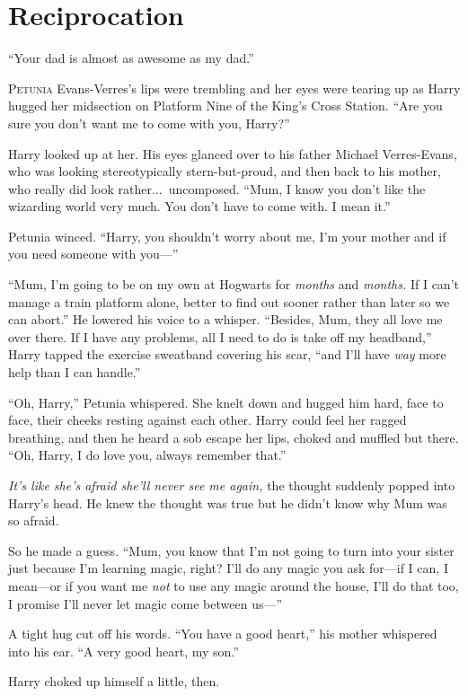 \chapter{Reciprocation}

\epigraph{“Your dad is almost as awesome as my dad.”}{}

\lettrine{P}{etunia} Evans-Verres’s lips were trembling and her eyes were tearing up as Harry hugged her midsection on Platform Nine of the King’s Cross Station. “Are you sure you don’t want me to come with you, Harry?”

Harry looked up at her. His eyes glanced over to his father Michael Verres-Evans, who was looking stereotypically stern-but-proud, and then back to his mother, who really did look rather...\ uncomposed. “Mum, I know you don’t like the wizarding world very much. You don’t have to come with. I mean it.”

Petunia winced. “Harry, you shouldn’t worry about me, I’m your mother and if you need someone with you—”

“Mum, I’m going to be on my own at Hogwarts for \emph{months} and \emph{months.} If I can’t manage a train platform alone, better to find out sooner rather than later so we can abort.” He lowered his voice to a whisper. “Besides, Mum, they all love me over there. If I have any problems, all I need to do is take off my headband,” Harry tapped the exercise sweatband covering his scar, “and I’ll have \emph{way} more help than I can handle.”

“Oh, Harry,” Petunia whispered. She knelt down and hugged him hard, face to face, their cheeks resting against each other. Harry could feel her ragged breathing, and then he heard a sob escape her lips, choked and muffled but there. “Oh, Harry, I do love you, always remember that.”

\emph{It’s like she’s afraid she’ll never see me again,} the thought suddenly popped into Harry’s head. He knew the thought was true but he didn’t know why Mum was so afraid.

So he made a guess. “Mum, you know that I’m not going to turn into your sister just because I’m learning magic, right? I’ll do any magic you ask for—if I can, I mean—or if you want me \emph{not} to use any magic around the house, I’ll do that too, I promise I’ll never let magic come between us—”

A tight hug cut off his words. “You have a good heart,” his mother whispered into his ear. “A very good heart, my son.”

Harry choked up himself a little, then.

